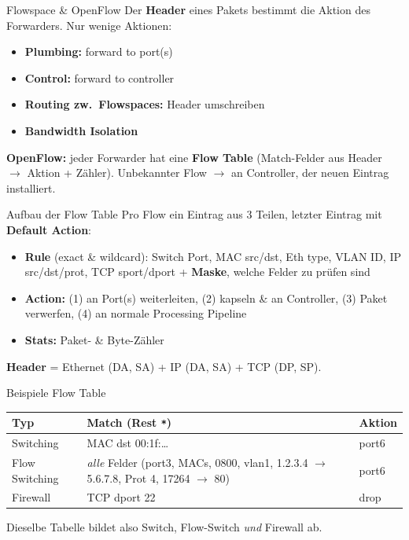 \documentclass[a4paper, fontsize=7pt]{scrartcl}
\renewcommand*{\arraystretch}{1.5}  %
\begin{document}
\begin{mainbox}{Flowspace \& OpenFlow}
Der \textbf{Header} eines Pakets bestimmt die Aktion des Forwarders. Nur
wenige Aktionen:
\begin{itemize}
    \item \textbf{Plumbing:} forward to port(s)
    \item \textbf{Control:} forward to controller
    \item \textbf{Routing zw.\ Flowspaces:} Header umschreiben
    \item \textbf{Bandwidth Isolation}
\end{itemize}
\textbf{OpenFlow:} jeder Forwarder hat eine \textbf{Flow Table}
(Match-Felder aus Header $\to$ Aktion + Zähler). Unbekannter Flow $\to$
an Controller, der neuen Eintrag installiert.
\end{mainbox}

\begin{mainbox}{Aufbau der Flow Table}
Pro Flow ein Eintrag aus 3 Teilen, letzter Eintrag mit \textbf{Default Action}:
\begin{itemize}
    \item \textbf{Rule} (exact \& wildcard): Switch Port, MAC src/dst, Eth type,
          VLAN ID, IP src/dst/prot, TCP sport/dport + \textbf{Maske}, welche
          Felder zu prüfen sind
    \item \textbf{Action:} (1) an Port(s) weiterleiten, (2) kapseln \& an
          Controller, (3) Paket verwerfen, (4) an normale Processing Pipeline
    \item \textbf{Stats:} Paket- \& Byte-Zähler
\end{itemize}
\textbf{Header} = Ethernet (DA, SA) + IP (DA, SA) + TCP (DP, SP).
\end{mainbox}

\begin{subbox}{Beispiele Flow Table}
\renewcommand*{\arraystretch}{1.15}
\setlength{\tabcolsep}{3pt}
\begin{tabularx}{\linewidth}{@{}l|>{\raggedright\arraybackslash}X|l@{}}
\textbf{Typ} & \textbf{Match} (Rest \texttt{*}) & \textbf{Aktion} \\
\hline
Switching & MAC dst 00:1f:\dots & port6 \\
Flow Switching & \emph{alle} Felder (port3, MACs, 0800, vlan1, 1.2.3.4
  $\to$ 5.6.7.8, Prot 4, 17264 $\to$ 80) & port6 \\
Firewall & TCP dport 22 & drop \\
\end{tabularx}
Dieselbe Tabelle bildet also Switch, Flow-Switch \emph{und} Firewall ab.
\end{subbox}
\end{document}
